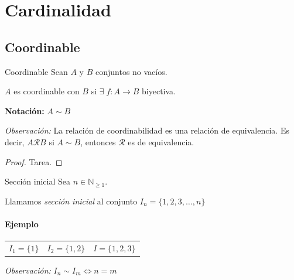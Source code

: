 \chapter{Cardinalidad}
\graphicspath{ {./teoria/resources/cardinalidad/} }

\section{Coordinable}

\begin{definicion}{Coordinable}{}
    Sean $A$ y $B$ conjuntos no vacíos.

    \medskip

     $A$ es coordinable con $B$ si $\exists \; f: A \to B$ biyectiva.

\bigskip
\textbf{Notación:} $A \sim B$
\end{definicion}



\bigskip
\textit{Observación:} 
La relación de coordinabilidad es una relación de equivalencia. 
Es decir, $A \mathcal{R} B$ si $A \sim B$, entonces $\mathcal{R}$
es de equivalencia.

\begin{proof} Tarea. %
\end{proof}

\begin{definicion}{Sección inicial}{}
        Sea $n \in \mathbb{N}_{\geq 1}$.

        Llamamos \textit{sección inicial} al conjunto 
        $I_n = \{1, 2, 3, \dotsc, n\}$ 
\end{definicion}

\subsubsection{Ejemplo}
\begin{center}
    \begin{tabular}{c c c}
        $I_1 = \{1\}$ &
        $I_2 = \{1,2\}$ &
        $I = \{1,2,3\}$
    \end{tabular}
\end{center}

\bigskip
\textit{Observación:} 
$I_n \sim I_m \iff n = m$

